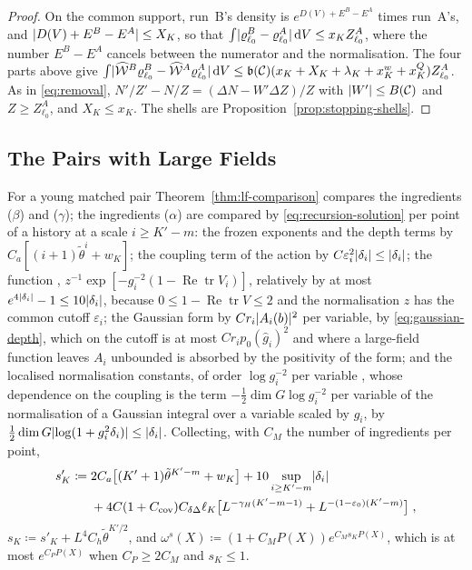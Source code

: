 \documentclass[11pt]{preprint}
\newcommand{\dd}{\mathrm{d}}
\newcommand{\tr}{\operatorname{tr}}
\DeclarePairedDelimiter{\abs}{\lvert}{\rvert}
\numberwithin{equation}{section}
\theoremstyle{definition}
\theoremstyle{remark}
\theoremstyle{plain}
\begin{document}
\begin{proof}
On the common support, run~B's density is $e^{D(V) + E^B - E^A}$ times run~A's, and $\abs{D(V) + E^B - E^A} \leq X_K$, so that $\int\abs{\varrho^B_{\ell_0} - \varrho^A_{\ell_0}}\,\dd V \leq x_KZ^A_{\ell_0}$, where the number $E^B - E^A$ cancels between the numerator and the normalisation. The four parts above give $\int\abs{\widehat{\mathcal W}^B\varrho^B_{\ell_0} - \widehat{\mathcal W}^A\varrho^A_{\ell_0}}\,\dd V \leq \mathfrak b(\mathcal C)(x_K + X_K + \lambda_K + x^w_K + x^Q_K)Z^A_{\ell_0}$. As in \eqref{eq:removal}, $N'/Z' - N/Z = (\Delta N - W'\Delta Z)/Z$ with $\abs{W'} \leq B(\mathcal C)$ and $Z \geq Z^A_{\ell_0}$, and $X_K \leq x_K$. The shells are Proposition~\ref{prop:stopping-shells}.
\end{proof}

\subsection{The Pairs with Large Fields}\label{sec:large-field-pairs}

For a young matched pair Theorem~\ref{thm:lf-comparison} compares the ingredients ($\beta$) and ($\gamma$); the ingredients ($\alpha$) are compared by \eqref{eq:recursion-solution} per point of a history at a scale $i \geq K' - m$: the frozen exponents and the depth terms by $C_a[(i + 1)\tilde\theta^i + w_K]$; the coupling term of the action by $C\varepsilon_i^2\abs{\delta_i} \leq \abs{\delta_i}$; the function \cite[(1.6), p.~178]{BalabanLFR1}, $z^{-1}\exp[-g_i^{-2}(1 - \operatorname{Re}\tr V_i)]$, relatively by at most $e^{4\abs{\delta_i}} - 1 \leq 10\abs{\delta_i}$, because $0 \leq 1 - \operatorname{Re}\tr V \leq 2$ and the normalisation $z$ has the common cutoff $\varepsilon_i$; the Gaussian form by $Cr_i\abs{A_i(b)}^2$ per variable, by \eqref{eq:gaussian-depth}, which on the cutoff is at most $Cr_ip_0(\hat g_i)^2$ and where a large-field function leaves $A_i$ unbounded is absorbed by the positivity of the form; and the localised normalisation constants, of order $\log g_i^{-2}$ per variable \cite[p.~380]{BalabanLFR2}, whose dependence on the coupling is the term $-\frac12\dim G\log g_i^{-2}$ per variable of the normalisation of a Gaussian integral over a variable scaled by $g_i$, by $\frac12\dim G\abs{\log(1 + g_i^2\delta_i)} \leq \abs{\delta_i}$. Collecting, with $C_M$ the number of ingredients per point,
\begin{equation}\label{eq:s-k}
\begin{aligned}
    s'_K \coloneqq{}& 2C_a\bigl[(K' + 1)\tilde\theta^{K'-m} + w_K\bigr] + 10\sup_{i \geq K'-m}\abs{\delta_i}\\
    &+ 4C(1 + C_{\mathrm{cov}})C_{\delta\Delta}\ell_K\bigl[L^{-\gamma_H(K'-m-1)} + L^{-(1-\varepsilon_0)(K'-m)}\bigr]\;,
\end{aligned}
\end{equation}
$s_K \coloneqq s'_K + L^4C_h\tilde\theta^{K'/2}$, and $\omega^s(X) \coloneqq (1 + C_MP(X))e^{C_Ms_KP(X)}$, which is at most $e^{C_PP(X)}$ when $C_P \geq 2C_M$ and $s_K \leq 1$.
\end{document}
